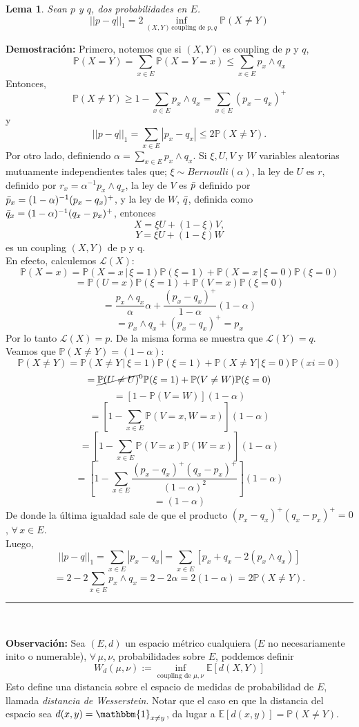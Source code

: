 \documentclass[a4paper]{article}
\newcommand{\prob}{\mathbb{P}}
\newtheorem{lem}{Lema}
\numberwithin{equation}{subsection}
\numberwithin{definicion}{subsection}
\def\E{\mathbb E}
\begin{document}
\begin{lem}
Sean $p$ y $q$, dos probabilidades en $E$. 
\[||p-q||_1 = 2 \inf_{(X,Y)\,\text{coupling de }p,q}\prob(X\neq Y)\]
\end{lem}

\textbf{Demostración: }Primero, notemos que  si $(X,Y)$ es coupling de $p$ y $q$,
\[\prob(X=Y)=\sum_{x\in E}\prob(X=Y=x) \leq \sum_{x\in E}p_x\wedge q_x\]
Entonces,
\[\prob(X\neq Y)\geq 1- \sum_{x \in E}p_x\wedge q_x = \sum_{x\in E}(p_x-q_x)^{+}\]
y
\[||p-q||_1 = \sum_{x\in E}|p_x-q_x| \leq 2\prob(X\neq Y).\]
Por otro lado, definiendo $\alpha = \sum_{x \in E}p_x\wedge q_x$. Si $\xi, U,V$ y $W$ variables aleatorias mutuamente independientes tales que; $\xi \sim Bernoulli(\alpha)$, la ley de $U$ es $r$, definido por $r_x=\alpha^{-1}p_x\wedge q_x$, la ley de $V$ es $\Bar{p}$ definido por $\Bar{p}_x = (1-\alpha)^{-1}(p_x-q_x)^{+}$, y la ley de $W$, $\Bar{q}$, definida como $\Bar{q}_x = (1-\alpha)^{-1}(q_x-p_x)^{+}$, entonces 
\[X= \xi U + (1-\xi)V,\]
\[Y =\xi U +(1-\xi)W\]
es un coupling $(X,Y)$ de p y q.\\ En efecto, calculemos $\mathcal{L}(X)$:
\[\prob(X=x) = \prob(X=x\,|\,\xi=1)\prob(\xi = 1) + \prob(X=x\,|\,\xi=0)\prob(\xi=0)\]
\[= \prob(U=x)\prob(\xi = 1) + \prob(V=x)\prob(\xi=0)\]
\[= \frac{p_x\wedge q_x}{\alpha}\alpha + \frac{(p_x - q_x)^{+}}{1-\alpha}(1-\alpha)\]
\[= p_x\wedge q_x + (p_x -q_x)^{+} = p_x\]
Por lo tanto $\mathcal{L}(X) = p$. De la misma forma se muestra que $\mathcal{L}(Y) = q$.\\ \newline
Veamos que $\prob(X\neq Y) = (1-\alpha)$:
\[\prob(X\neq Y) = \prob(X\neq Y\,|\,\xi=1)\prob(\xi=1) + \prob(X\neq Y\,|\,\xi=0)\prob(xi=0)\]
\[= \cancel{\prob(U\neq U)}^{0}\prob(\xi=1) + \prob(V\neq W)\prob(\xi =0)\]
\[= \left[ 1-\prob(V=W)\right](1-\alpha)\]
\[= \left[1 - \sum_{x \in E}\prob(V=x,W=x)\right](1-\alpha)\]
\[= \left[1 - \sum_{x \in E}\prob(V=x)\prob(W=x)\right](1-\alpha)\]
\[=\left[ 1- \sum_{x\in E}\frac{(p_x -q_x)^{+}(q_x-p_x)^{+}}{(1-\alpha)^{2}}\right](1-\alpha)\]
\[=(1-\alpha)\]
De donde la última igualdad sale de que el producto $(p_x-q_x)^{+}(q_x-p_x)^{+} = 0$, $\forall\,x\in E$.\\ \newline
Luego, 
\[||p-q||_1 = \sum_{x\in E}|p_x-q_x| = \sum_{x\in E}[p_x+q_x-2(p_x\wedge q_x)]\]
\[= 2 - 2\sum_{x\in E}p_x\wedge q_x = 2-2\alpha = 2(1-\alpha) = 2\prob(X\neq Y).\]
\rule{0.7em}{0.7em}\\ \newline

\textbf{Observación: }Sea $(E,d)$ un espacio métrico cualquiera ($E$ no necesariamente inito o numerable), $\forall\,\mu,\nu$, probabilidades sobre $E$, poddemos definir
\[W_d(\mu,\nu) :=\inf_{\text{coupling de }\mu,\nu} \E\left[d(X,Y)\right]\]
Esto define una distancia sobre el espacio de medidas de probabilidad de $E$, llamada \textit{distancia de Wesserstein}. Notar que el caso en que la distancia del espacio sea $d(x,y)=\mathbbm{1}_{x\neq y}$, da lugar a $\E\left[d(x,y)\right] = \prob(X\neq Y)$.
\end{document}
